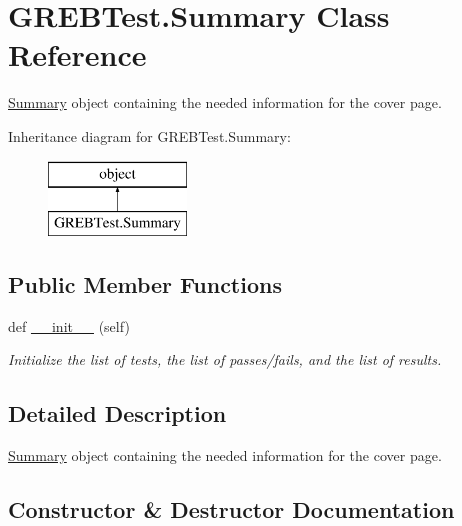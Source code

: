 \hypertarget{class_g_r_e_b_test_1_1_summary}{}\section{G\+R\+E\+B\+Test.\+Summary Class Reference}
\label{class_g_r_e_b_test_1_1_summary}


\hyperlink{class_g_r_e_b_test_1_1_summary}{Summary} object containing the needed information for the cover page.  


Inheritance diagram for G\+R\+E\+B\+Test.\+Summary\+:\begin{figure}[H]
\begin{center}
\leavevmode
\includegraphics[height=2.000000cm]{class_g_r_e_b_test_1_1_summary}
\end{center}
\end{figure}
\subsection*{Public Member Functions}
\begin{DoxyCompactItemize}
\item 
def \hyperlink{class_g_r_e_b_test_1_1_summary_addc6e11f2d5be8b5d1fe8a4e9bfb1a74}{\+\_\+\+\_\+init\+\_\+\+\_\+} (self)
\begin{DoxyCompactList}\small\item\em Initialize the list of tests, the list of passes/fails, and the list of results. \end{DoxyCompactList}\end{DoxyCompactItemize}


\subsection{Detailed Description}
\hyperlink{class_g_r_e_b_test_1_1_summary}{Summary} object containing the needed information for the cover page. 



\subsection{Constructor \& Destructor Documentation}
